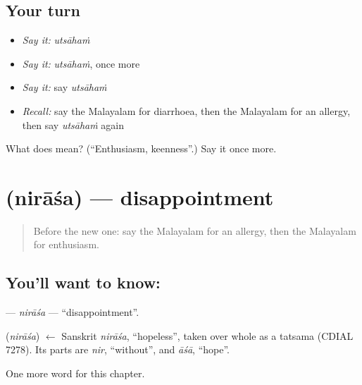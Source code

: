 \subsection*{Your turn}
\begin{itemize}
\raggedright
  \item \emph{Say it:} \emph{utsāhaṁ}
  \item \emph{Say it:} \emph{utsāhaṁ}, once more
  \item \emph{Say it:} say \emph{utsāhaṁ}
  \item \emph{Recall:} say the Malayalam for diarrhoea, then the Malayalam for an allergy, then say \emph{utsāhaṁ} again
\end{itemize}

\begin{tcolorbox}[breakable,colback=teal!4,colframe=teal!35!black,title={Before you move on}]
What does  mean? (\textquotedblleft{}Enthusiasm, keenness\textquotedblright{}.) Say it once more.
\end{tcolorbox}
\section[\texorpdfstring{\ml{നിരാശ} (nirāśa)}{നിരാശ (nirāśa)}]{ (nirāśa) — disappointment}

\label{lesson:ML-C234-nirasa}



\begin{quote}
Before the new one: say the Malayalam for an allergy, then the Malayalam for enthusiasm.
\end{quote}

\subsection*{You'll want to know: }
\textbf{} — \emph{nirāśa} — \textquotedblleft{}disappointment\textquotedblright{}.

\begin{cousinweb}
\textbf{} (\emph{nirāśa}) $\leftarrow$ Sanskrit \emph{nirāśa}, \textquotedblleft{}hopeless\textquotedblright{}, taken over whole as a tatsama (CDIAL 7278). Its parts are \emph{nir}, \textquotedblleft{}without\textquotedblright{}, and \emph{āśā}, \textquotedblleft{}hope\textquotedblright{}.
\end{cousinweb}

\begin{grammarlens}[title={What you've built}]
One more word for this chapter.
\end{grammarlens}

